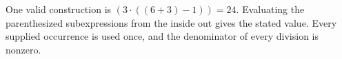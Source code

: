 One valid construction is $\boxed{(3\cdot ((6+3)-1))=24}$. Evaluating the parenthesized subexpressions from the inside out gives the stated value. Every supplied occurrence is used once, and the denominator of every division is nonzero.
